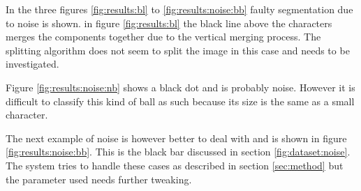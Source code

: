 In the three figures \ref{fig:results:bl} to \ref{fig:results:noise:bb} faulty segmentation due to noise is shown. in figure \ref{fig:results:bl} the black line above the characters merges the components together due to the vertical merging process. The splitting algorithm does not seem to split the image in this case and needs to be investigated.

Figure \ref{fig:results:noise:nb} shows a black dot and is probably noise. However it is difficult to classify this kind of ball as such because its size is the same as a small character.

The next example of noise is however better to deal with and is shown in figure \ref{fig:results:noise:bb}. This is the black bar discussed in section \ref{fig:dataset:noise}. The system tries to handle these cases as described in section \ref{sec:method} but the parameter used needs further tweaking. 

